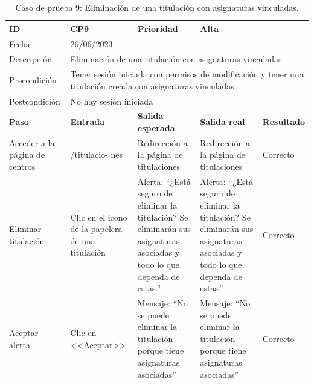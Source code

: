 \begin{table}[H]
\begin{tabular}{p{} p{} p{} p{} p{}}
\cellcolor{gray!25}
ID   & CP9 & \cellcolor{gray!25} Prioridad   & Alta \\ \hline
\cellcolor{gray!25} Fecha	&	\multicolumn{4}{l}{26/06/2023} \\ \hline
\cellcolor{gray!25} Descripción		&	\multicolumn{4}{p{.66\textwidth}}{Eliminación de una titulación con asignaturas vinculadas} \\ \hline                                            
\cellcolor{gray!25}
Precondición  & \multicolumn{4}{p{.66\textwidth}}{Tener sesión iniciada con permisos de modificación y tener una titulación creada con asignaturas vinculadas} \\ \hline
\cellcolor{gray!25} Postcondición & \multicolumn{4}{l}{No hay sesión iniciada}                                                    \\ \hline
\rowcolor{gray!25}
\textbf{Paso}   & \textbf{Entrada} & \textbf{Salida esperada} & \textbf{Salida real} & \textbf{Resultado} \\ \hline
Acceder a la página de centros 
& /titulacio-
nes                                                                           
& Redirección a la página de titulaciones                                   
& Redirección a la página de titulaciones                                   
& Correcto                            
\\ \hline
Eliminar titulación
& Clic en el icono de la papelera de una titulación
& Alerta: ``¿Está seguro de eliminar la titulación? Se eliminarán sus asignaturas asociadas y todo lo que dependa de estas.''
& Alerta: ``¿Está seguro de eliminar la titulación? Se eliminarán sus asignaturas asociadas y todo lo que dependa de estas.''
& Correcto
\\ \hline
Aceptar alerta
& Clic en <<Aceptar>>
& Mensaje: ``No se puede eliminar la titulación porque tiene asignaturas asociadas''                            
& Mensaje: ``No se puede eliminar la titulación porque tiene asignaturas asociadas''
& Correcto                            
\\ \hline                
\end{tabular}
\caption{Caso de prueba 9: Eliminación de una titulación con asignaturas vinculadas.}
\end{table}


